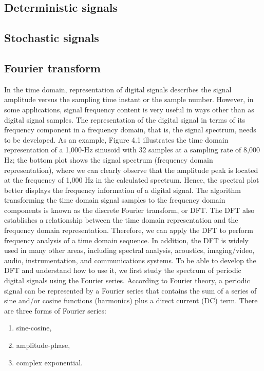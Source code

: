 \subsection{Deterministic signals}
\FloatBarrier

\subsection{Stochastic signals}
\FloatBarrier
\subsection{Fourier transform}
\FloatBarrier
In the time domain, representation of digital signals describes the signal amplitude versus the 
sampling time instant or the sample number. However, in some applications, signal frequency content
is very useful in ways other than as digital signal samples.
The representation of the digital signal in terms of its frequency component in a frequency domain,
that is, the signal spectrum, needs to be developed. As an example, Figure 4.1 illustrates the time
domain representation of a 1,000-Hz sinusoid with 32 samples at a sampling rate of 8,000 Hz;
the bottom plot shows the signal spectrum (frequency domain representation), where we can clearly
observe that the amplitude peak is located at the frequency of 1,000 Hz in the calculated spectrum.
Hence, the spectral plot better displays the frequency information of a digital signal.
The algorithm transforming the time domain signal samples to the frequency domain components
is known as the discrete Fourier transform, or DFT. The DFT also establishes a relationship between
the time domain representation and the frequency domain representation. Therefore, we can apply the
DFT to perform frequency analysis of a time domain sequence. In addition, the DFT is widely used in
many other areas, including spectral analysis, acoustics, imaging/video, audio, instrumentation,
and communications systems.
To be able to develop the DFT and understand how to use it, we first study the spectrum of periodic
digital signals using the Fourier series.
According to Fourier
theory, a periodic signal can be represented by a Fourier series that contains the sum of a series
of sine and/or cosine functions (harmonics) plus a direct current (DC) term. 
There are three forms of Fourier series:
\begin{enumerate}
	\item sine-cosine,
	\item amplitude-phase,
	\item complex exponential.
\end{enumerate}


